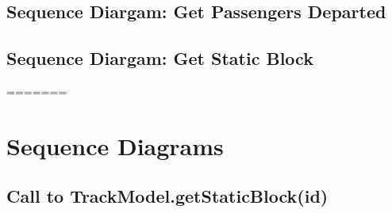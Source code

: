 \documentclass{scrreprt}
\begin{document}
\subsection{Sequence Diargam: Get Passengers Departed}
\begin{center}
\end{center}

\subsection{Sequence Diargam: Get Static Block}
=======
\section{Sequence Diagrams}

\subsection{Call to TrackModel.getStaticBlock(id)}
\end{document}
